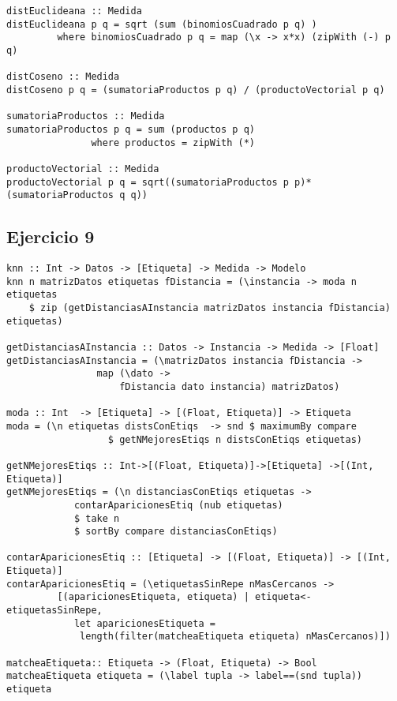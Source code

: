 \documentclass[spanish, 10pt,a4paper]{article}
\numberwithin{equation}{section} %
\begin{document}
\begin{lstlisting}
distEuclideana :: Medida
distEuclideana p q = sqrt (sum (binomiosCuadrado p q) ) 
		 where binomiosCuadrado p q = map (\x -> x*x) (zipWith (-) p q)

distCoseno :: Medida
distCoseno p q = (sumatoriaProductos p q) / (productoVectorial p q)

sumatoriaProductos :: Medida
sumatoriaProductos p q = sum (productos p q)
		       where productos = zipWith (*)

productoVectorial :: Medida
productoVectorial p q = sqrt((sumatoriaProductos p p)*(sumatoriaProductos q q))
\end{lstlisting}


\subsection{Ejercicio 9}

\begin{lstlisting}
knn :: Int -> Datos -> [Etiqueta] -> Medida -> Modelo
knn n matrizDatos etiquetas fDistancia = (\instancia -> moda n etiquetas 
    $ zip (getDistanciasAInstancia matrizDatos instancia fDistancia) etiquetas)

getDistanciasAInstancia :: Datos -> Instancia -> Medida -> [Float]
getDistanciasAInstancia = (\matrizDatos instancia fDistancia ->
				map (\dato -> 
					fDistancia dato instancia) matrizDatos) 

moda :: Int  -> [Etiqueta] -> [(Float, Etiqueta)] -> Etiqueta
moda = (\n etiquetas distsConEtiqs  -> snd $ maximumBy compare 
				  $ getNMejoresEtiqs n distsConEtiqs etiquetas)

getNMejoresEtiqs :: Int->[(Float, Etiqueta)]->[Etiqueta] ->[(Int, Etiqueta)]
getNMejoresEtiqs = (\n distanciasConEtiqs etiquetas -> 
			contarAparicionesEtiq (nub etiquetas) 
			$ take n 
			$ sortBy compare distanciasConEtiqs)

contarAparicionesEtiq :: [Etiqueta] -> [(Float, Etiqueta)] -> [(Int, Etiqueta)]
contarAparicionesEtiq = (\etiquetasSinRepe nMasCercanos ->
		 [(aparicionesEtiqueta, etiqueta) | etiqueta<-etiquetasSinRepe, 
			let aparicionesEtiqueta = 
			 length(filter(matcheaEtiqueta etiqueta) nMasCercanos)])

matcheaEtiqueta:: Etiqueta -> (Float, Etiqueta) -> Bool
matcheaEtiqueta etiqueta = (\label tupla -> label==(snd tupla)) etiqueta
\end{lstlisting}
\end{document}
